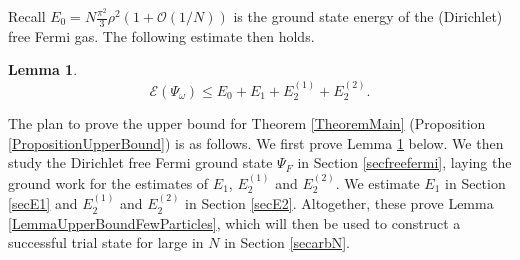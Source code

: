 \documentclass[a4paper,11pt]{article}
\newtheorem{lemma}[theorem]{Lemma}
\numberwithin{equation}{section}
\begin{document}
	Recall $E_0=N\frac{\pi^2}{3}\rho^2(1+\mathcal{O}(1/N)) $ is the ground state energy of the (Dirichlet) free Fermi gas. The following estimate then holds.
	\begin{lemma}\label{LemmaEnergyFunctionalBound}
		\begin{equation}\label{EqBound1}
			\mathcal{E}(\Psi_\omega)\leq E_0+ E_1+E_2^{(1)}+E_2^{(2)}.
		\end{equation}
	\end{lemma}
	The plan to prove the upper bound for Theorem \ref{TheoremMain} (Proposition \ref{PropositionUpperBound}) is as follows. We first prove Lemma \ref{LemmaEnergyFunctionalBound} below. We then study the Dirichlet free Fermi ground state $\Psi_F$ in Section \ref{secfreefermi}, laying the ground work for the estimates of $E_1$, $E_2^{(1)}$ and $E_2^{(2)}$. We estimate $E_1$ in Section \ref{secE1} and $E^{(1)}_2$ and $E^{(2)}_2$ in Section \ref{secE2}. Altogether, these prove Lemma \ref{LemmaUpperBoundFewParticles}, which will then be used to construct a successful trial state for large in $N$ in Section \ref{secarbN}.
\end{document}
